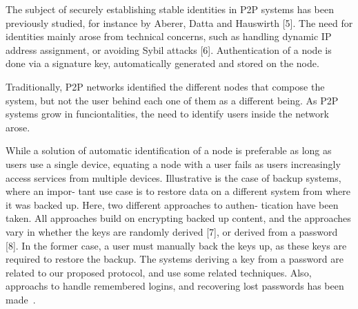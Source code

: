 The subject of securely establishing stable identities in P2P
systems has been previously studied, for instance by Aberer,
Datta and Hauswirth [5]. The need for identities mainly arose
from technical concerns, such as handling dynamic IP address
assignment, or avoiding Sybil attacks [6]. Authentication of a
node is done via a signature key, automatically generated and
stored on the node.

Traditionally, P2P networks identified the different nodes that compose the
system, but not the user behind each one of them as a different being.
As P2P systems grow in funciontalities, the need to identify users inside the
network arose.

While a solution of automatic identification of a node is preferable as long as
users use a single device, equating a node with a user fails as users
increasingly access services from multiple devices.
Illustrative is the case of backup systems, where an impor-
tant use case is to restore data on a different system from where
it was backed up. Here, two different approaches to authen-
tication have been taken. All approaches build on encrypting
backed up content, and the approaches vary in whether the
keys are randomly derived [7], or derived from a password [8].
In the former case, a user must manually back the keys up,
as these keys are required to restore the backup. The systems
deriving a key from a password are related to our proposed
protocol, and use some related techniques. Also, approachs to handle
remembered logins, and recovering lost passwords has been
made~\cite{kreitz2012passwords}.


